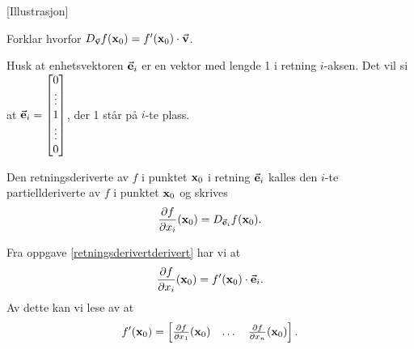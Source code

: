 [Illustrasjon]

\begin{oppgave}\label{retningsderivertderivert}
  Forklar hvorfor $D_{\vec{\mathbf{v}}} f(\mathbf{x}_0) = f'(\mathbf{x}_0)\cdot \vec{\mathbf{v}}$.
\end{oppgave}
  Husk at enhetsvektoren $\vec{\mathbf{e}}_i$ er en vektor med lengde 1 i retning $i$-aksen. Det vil
  si at $\vec{\mathbf{e}}_i = \begin{bmatrix} 0 \\ \vdots \\ 1 \\ \vdots \\ 0 \end{bmatrix}$, der 1
  står på $i$-te plass.
\begin{definisjon}
  Den retningsderiverte av $f$ i punktet $\mathbf{x}_0$ i retning $\vec{\mathbf{e}}_i$
  kalles den $i$-te partiellderiverte av $f$ i punktet $\mathbf{x}_0$ og skrives
  $$\frac{\partial f}{\partial x_i}(\mathbf{x}_0) = D_{\vec{\mathbf{e}}_i} f(\mathbf{x}_0).$$
\end{definisjon}
Fra oppgave \ref{retningsderivertderivert} har vi at
$$\frac{\partial f}{\partial x_i}(\mathbf{x}_0) = f'(\mathbf{x}_0)\cdot \vec{\mathbf{e}}_i.$$
Av dette kan vi lese av at
$$f'(\mathbf{x}_0) = \begin{bmatrix} \frac{\partial f}{\partial x_1}(\mathbf{x}_0) & \dots & \frac{\partial f}{\partial x_n}(\mathbf{x}_0) \end{bmatrix}.$$

